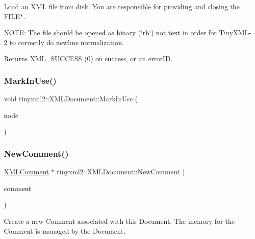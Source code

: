 Load an X\+ML file from disk. You are responsible for providing and closing the F\+I\+L\+E$\ast$.

N\+O\+TE\+: The file should be opened as binary (\char`\"{}rb\char`\"{}) not text in order for Tiny\+X\+M\+L-\/2 to correctly do newline normalization.

Returns X\+M\+L\+\_\+\+S\+U\+C\+C\+E\+SS (0) on success, or an error\+ID. \mbox{\label{classtinyxml2_1_1_x_m_l_document_a95d28ecb4760a994556b0a51690b21be}} 
\subsubsection{\texorpdfstring{Mark\+In\+Use()}{MarkInUse()}}
{\footnotesize\ttfamily void tinyxml2\+::\+X\+M\+L\+Document\+::\+Mark\+In\+Use (\begin{DoxyParamCaption}\item[{\mbox{\hyperlink{classtinyxml2_1_1_x_m_l_node}{X\+M\+L\+Node}} $\ast$}]{node }\end{DoxyParamCaption})}

\mbox{\label{classtinyxml2_1_1_x_m_l_document_a386df0befd06aadb5e0cd21381aa955a}} 
\subsubsection{\texorpdfstring{New\+Comment()}{NewComment()}}
{\footnotesize\ttfamily \mbox{\hyperlink{classtinyxml2_1_1_x_m_l_comment}{X\+M\+L\+Comment}} $\ast$ tinyxml2\+::\+X\+M\+L\+Document\+::\+New\+Comment (\begin{DoxyParamCaption}\item[{const char $\ast$}]{comment }\end{DoxyParamCaption})}

Create a new Comment associated with this Document. The memory for the Comment is managed by the Document. \mbox{\label{classtinyxml2_1_1_x_m_l_document_ae519030c0262fa2daff8993681990e16}} 
